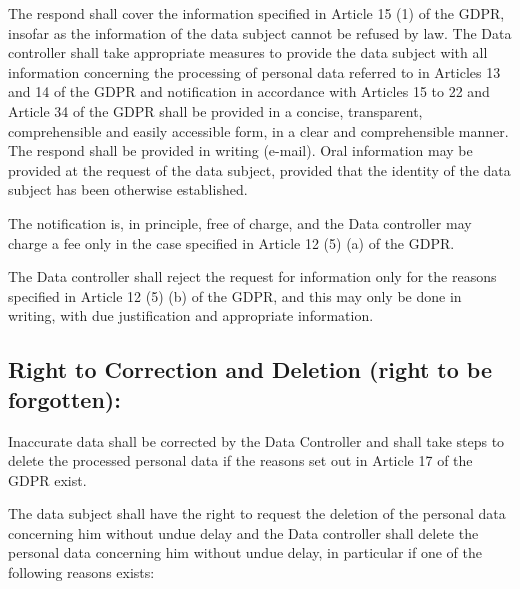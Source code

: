\documentclass[11pt]{article}
\begin{document}
The respond shall cover the information specified in Article 15 (1) of the GDPR, insofar as the information of the data subject cannot be refused by law. The Data controller shall take appropriate measures to provide the data subject with all information concerning the processing of personal data referred to in Articles 13 and 14 of the GDPR and notification in accordance with Articles 15 to 22 and Article 34 of the GDPR shall be provided in a concise, transparent, comprehensible and easily accessible form, in a clear and comprehensible manner. The respond shall be provided in writing (e-mail). Oral information may be provided at the request of the data subject, provided that the identity of the data subject has been otherwise established.

The notification is, in principle, free of charge, and the Data controller may charge a fee only in the case specified in Article 12 (5) (a) of the GDPR.

The Data controller shall reject the request for information only for the reasons specified in Article 12 (5) (b) of the GDPR, and this may only be done in writing, with due justification and appropriate information.

\subsection{Right to Correction and Deletion (right to be forgotten):}
Inaccurate data shall be corrected by the Data Controller and shall take steps to delete the processed personal data if the reasons set out in Article 17 of the GDPR exist.

The data subject shall have the right to request the deletion of the personal data concerning him without undue delay and the Data controller shall delete the personal data concerning him without undue delay, in particular if one of the following reasons exists:
\end{document}

